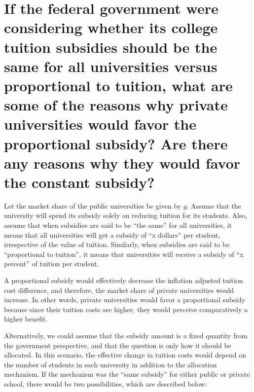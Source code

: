 \documentclass[12pt]{paper}
\begin{document}


\section{If the federal government were considering whether its
  college tuition subsidies should be the same for all universities
  versus proportional to tuition, what are some of the reasons why
  private universities would favor the proportional subsidy? Are there any reasons why they would favor the constant
  subsidy?}

Let the market share of the public universities be given by
$g$. Assume that the university will spend its subsidy solely on
reducing tuition for its students. Also, assume that when subsidies
are said to be ``the same'' for all universities, it means that all
universities will get a subsidy of ``x dollars'' per student,
irrespective of the value of tuition. Similarly, when subsidies are
said to be ``proportional to tuition'', it means that universities will
receive a subsidy of ``x percent'' of tuition per student.

A proportional subsidy would effectively decrease the inflation
adjusted tuition cost difference, and therefore, the market share of
private universities would increase. In other words, private
universities would favor a proportional subsidy because since their
tuition costs are higher, they would perceive comparatively a higher
benefit.

Alternatively, we could assume that the subsidy amount is a fixed
quantity from the government perspective, and that the question is
only how it should be allocated. In this scenario, the effective
change in tuition costs would depend on the number of students in each
university in addition to the allocation mechanism. If the mechanism
was the ``same subsidy'' for either public or private school, there
would be two possibilities, which are described below:
\end{document}

